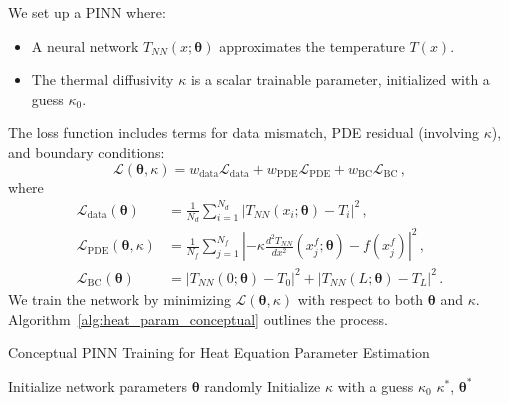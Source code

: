 We set up a PINN where:
\begin{itemize}
    \item A neural network $T_{NN}(x; \boldsymbol{\theta})$ approximates the temperature $T(x)$.
    \item The thermal diffusivity $\kappa$ is a scalar trainable parameter, initialized with a guess $\kappa_0$.
\end{itemize}
The loss function includes terms for data mismatch, PDE residual (involving $\kappa$), and boundary conditions:
%
\begin{equation*}
\mathcal{L}(\boldsymbol{\theta}, \kappa) = w_{\text{data}}\mathcal{L}_{\text{data}} + w_{\text{PDE}}\mathcal{L}_{\text{PDE}} + w_{\text{BC}}\mathcal{L}_{\text{BC}}\,,
\end{equation*}
%
where
%
\begin{align*}
\mathcal{L}_\text{data}(\boldsymbol{\theta}) &= \frac{1}{N_d}\sum_{i=1}^{N_d}|T_{NN}(x_i; \boldsymbol{\theta}) - T_i|^2\,, \\
\mathcal{L}_\text{PDE}(\boldsymbol{\theta}, \kappa) &= \frac{1}{N_f}\sum_{j=1}^{N_f}|-\kappa\frac{d^2T_{NN}}{dx^2}(x_j^f; \boldsymbol{\theta}) - f(x_j^f)|^2\,, \\
\mathcal{L}_\text{BC}(\boldsymbol{\theta}) &= |T_{NN}(0; \boldsymbol{\theta}) - T_0|^2 + |T_{NN}(L; \boldsymbol{\theta}) - T_L|^2\,.
\end{align*}
%
We train the network by minimizing $\mathcal{L}(\boldsymbol{\theta}, \kappa)$ with respect to both $\boldsymbol{\theta}$ and $\kappa$. Algorithm~\ref{alg:heat_param_conceptual} outlines the process.

\begin{algorithm}[htbp] %
\caption{Conceptual PINN Training for Heat Equation Parameter Estimation}
\label{alg:heat_param_conceptual}
\SetAlgoLined
{}

Initialize network parameters $\boldsymbol{\theta}$ randomly\;
Initialize $\kappa$ with a guess $\kappa_0$\;
\Return $\kappa^*$, $\boldsymbol{\theta}^*$
\end{algorithm}

